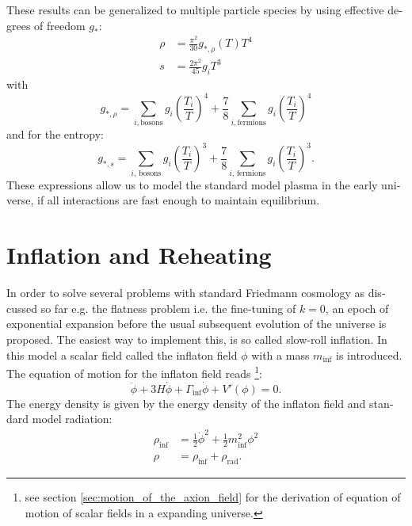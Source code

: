 \documentclass[master,       %
               twoside,        %
               BCOR10mm,       %
               english,ngerman, %
               ]{GAUBM}
\begin{document}
\begin{otherlanguage}{english}
These results can be generalized to multiple particle species by using effective degrees of freedom $g_*$:
\begin{align}
	\rho &= \frac{\pi^2}{30} g_{*, \rho}(T) T^4 \nonumber \\
	s &= \frac{2 \pi^2}{45} g_i T^3
\end{align}
with
\begin{equation}
	g_{*, \rho} = \sum_{i, \text{bosons}} g_i \left( \frac{T_i}{T} \right)^4 + \frac{7}{8} \sum_{i, \text{fermions}} g_i \left( \frac{T_i}{T} \right)^4
\end{equation}
and for the entropy:
\begin{equation}
	g_{*, s} = \sum_{i,\, \text{bosons}} g_i \left( \frac{T_i}{T} \right)^3 + \frac{7}{8} \sum_{i,\, \text{fermions}} g_i \left( \frac{T_i}{T} \right)^3.
\end{equation}
These expressions allow us to model the standard model plasma in the early universe, if
all interactions are fast enough to maintain equilibrium.


\section{Inflation and Reheating}
In order to solve several problems with standard Friedmann cosmology as discussed so far e.g. the flatness problem i.e. the fine-tuning of $k = 0$,
an epoch of exponential expansion before the usual subsequent evolution of the universe is proposed. The easiest way to implement this, is so called slow-roll inflation. In this model a scalar field called the inflaton field $\phi$ with a mass $m_\mathrm{inf}$ is introduced. The equation of motion for the inflaton field reads \footnote{see section \ref{sec:motion_of_the_axion_field} for the derivation of equation of motion of scalar fields in a expanding universe.}:
\begin{equation}
	\label{eq:inflaton_field_eq}
	\ddot{\phi} + 3 H \dot{\phi} + \Gamma_\mathrm{inf} \dot{\phi} + V'(\phi) = 0.
\end{equation}
The energy density is given by the energy density of the inflaton field
and standard model radiation:
\begin{align}
	\rho_\mathrm{inf} &= \frac{1}{2} \dot{\phi}^2 + \frac{1}{2} m_\mathrm{inf}^2 \phi^2 \\
	\rho &= \rho_\mathrm{inf} + \rho_\mathrm{rad}.
\end{align}



\end{otherlanguage}
\end{document}
